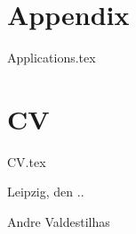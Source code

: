 \documentclass[a4paper,twoside,abstracton,12pt,BCOR=15mm]{scrreprt}
\begin{document}
\appendix

\chapter{Appendix}
{Applications.tex}

\chapter{CV} \label{ch:cv}
{CV.tex}







\vspace{20pt}\noindent
Leipzig, den \the\day.\the\month.\the\year

\vspace{80pt}\noindent
Andre Valdestilhas
\end{document}
